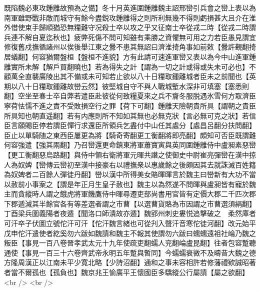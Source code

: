 既陷魏必東攻鍾離故預為之備】冬十月英進圍鍾離魏主詔邢巒引兵會之巒上表以為南軍雖野戰非敵而城守有餘今盡鋭攻鍾離得之則所利無幾不得則虧損甚大且介在淮外借使束手歸順猶恐無糧難守况殺士卒以攻之乎又征南士卒從戎二時【從戎二時謂兵連不解自夏迄秋也】疲弊死傷不問可知雖有乘勝之資懼無可用之力若臣愚見謂宜修復舊戍撫循諸州以俟後舉江東之釁不患其無詔曰濟淮掎角事如前敕【釁許覲翻掎居蟻翻】何容猶爾盤桓【盤桓不進貌】方有此請可速進軍巒又表以為今中山進軍鍾離實所未解【解戶買翻曉也】若為得失之計【謂為一切之計或得或失未可必也】不顧萬全直襲廣陵出其不備或未可知若止欲以八十日糧取鍾離城者臣未之前聞也【英期以八十日糧取鍾離故巒云然】彼堅城自守不與人戰城塹水深非可填塞【塞悉則翻】空坐至春士卒自弊若遣臣赴彼從何致糧夏來之兵不齎冬服脱遇氷雪何方取濟臣寧荷怯懦不進之責不受敗損空行之罪【荷下可翻】鍾離天險朝貴所具【謂朝之貴臣所具知也朝直遥翻】若有内應則所不知如其無也必無克狀【言必無可克之狀】若信臣言願賜臣停若謂臣憚行求還臣所領兵乞盡付中山任其處分【處昌呂翻分扶問翻】臣止以單騎随之東西臣屢更為將【騎奇寄翻更工衡翻將即亮翻】頗知可否臣既謂難何容強遣【強其兩翻】乃召巒還更命鎮東將軍蕭寶寅與英同圍鍾離侍中盧昶素惡巒【更工衡翻惡烏路翻】與侍中領右衛將軍元暉共譖之使御史中尉崔亮彈巒在漢中掠人為奴婢【巒傳云巒初至漢中接豪右以禮撫衆以惠歲餘之後頗因其去就誅滅百姓籍為奴婢者二百餘人彈徒丹翻】巒以漢中所得美女賂暉暉言於魏主曰巒新有大功不當以赦前小事案之【謂是年正月生皇子赦也】魏主以為然遂不問暉與盧昶皆有寵於魏主而貪縱時人謂之餓虎將軍饑鷹侍中暉尋遷吏部尚書用官皆有定價大郡二千匹次郡下郡遞減其半餘官各有等差選者謂之市曹【以選曹貨賂為市因謂之市曹選須絹翻】　丁酉梁兵圍義陽者夜遁【聞洛口師潰故亦遁】魏郢州刺史婁悦追擊破之　柔然庫者可汗卒子伏圖立號佗汗可汗【佗汗魏言緒也可從刋入聲汗音寒佗徒河翻】改元始平戊申佗汗遣使者紇奚勿六跋如魏請和魏主不報其使謂勿六跋曰蠕蠕遠祖社崘乃魏之叛臣【事見一百八卷晉孝武太元十九年使疏吏翻蠕人兖翻崘盧昆翻】往者包容蹔聽通使【事見一百三十六卷齊武帝永明五年蹔與暫同】今蠕蠕衰微不及疇昔大魏之德方隆周漢正以江南未平少寛北略【少詩沼翻】通和之事未容相許若修藩禮欵誠昭著者當不爾孤也【孤負也】魏京兆王愉廣平王懷國臣多驕縱公行屬請【屬之欲翻】<br />
<br />
